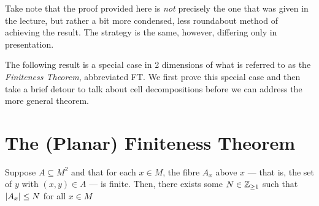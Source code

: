 \begin{svgraybox}
	Take note that the proof provided here is \emph{not} precisely the one that was given in the lecture, but rather a bit more condensed, less roundabout method of achieving the result. The strategy is the same, however, differing only in presentation.
\end{svgraybox}


The following result is a special case in 2 dimensions of what is referred to as the \emph{Finiteness Theorem}, abbreviated FT. We first prove this special case and then take a brief detour to talk about cell decompositions before we can address the more general theorem.

\section{The (Planar) Finiteness Theorem}

\begin{theorem}
	\label{thm:2finiteness}
	Suppose $A \subseteq M^2$ and that for each $x \in M$, the fibre $A_x$ above $x$ — that is, the set of $y$ with $(x, y) \in A$ — is finite. Then, there exists some $N \in \mathbb{Z}_{\geq 1}$ such that $\vert A_x\vert \leq N$ for all $x \in M$
\end{theorem}

